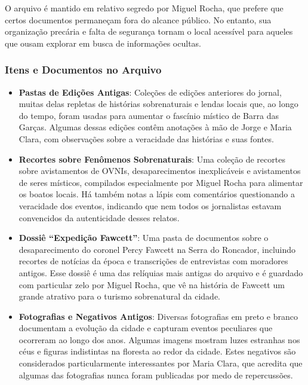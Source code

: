 O arquivo é mantido em relativo segredo por Miguel Rocha, que prefere que certos documentos permaneçam fora do alcance público. No entanto, sua organização precária e falta de segurança tornam o local acessível para aqueles que ousam explorar em busca de informações ocultas.

\subsubsection{Itens e Documentos no Arquivo}

\begin{itemize}
    \item \textbf{Pastas de Edições Antigas}: Coleções de edições anteriores do jornal, muitas delas repletas de histórias sobrenaturais e lendas locais que, ao longo do tempo, foram usadas para aumentar o fascínio místico de Barra das Garças. Algumas dessas edições contêm anotações à mão de Jorge e Maria Clara, com observações sobre a veracidade das histórias e suas fontes.
    
    \item \textbf{Recortes sobre Fenômenos Sobrenaturais}: Uma coleção de recortes sobre avistamentos de OVNIs, desaparecimentos inexplicáveis e avistamentos de seres místicos, compilados especialmente por Miguel Rocha para alimentar os boatos locais. Há também notas a lápis com comentários questionando a veracidade dos eventos, indicando que nem todos os jornalistas estavam convencidos da autenticidade desses relatos.
    
    \item \textbf{Dossiê ``Expedição Fawcett''}: Uma pasta de documentos sobre o desaparecimento do coronel Percy Fawcett na Serra do Roncador, incluindo recortes de notícias da época e transcrições de entrevistas com moradores antigos. Esse dossiê é uma das relíquias mais antigas do arquivo e é guardado com particular zelo por Miguel Rocha, que vê na história de Fawcett um grande atrativo para o turismo sobrenatural da cidade.
    
    \item \textbf{Fotografias e Negativos Antigos}: Diversas fotografias em preto e branco documentam a evolução da cidade e capturam eventos peculiares que ocorreram ao longo dos anos. Algumas imagens mostram luzes estranhas nos céus e figuras indistintas na floresta ao redor da cidade. Estes negativos são considerados particularmente interessantes por Maria Clara, que acredita que algumas das fotografias nunca foram publicadas por medo de repercussões.
    

\end{itemize}
